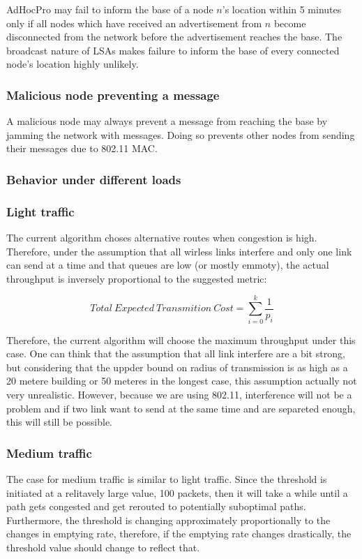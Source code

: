 \documentclass[letterpaper]{article}
\begin{document}
AdHocPro may fail to inform the base of a node $n$'s location within 5 minutes only if all nodes which have received an
advertisement from $n$ become disconnected from the network before the advertisement reaches the base. The broadcast
nature of LSAs makes failure to inform the base of every connected node's location highly unlikely.

\subsubsection{Malicious node preventing a message}

A malicious node may always prevent a message from reaching the base by jamming the network with messages. Doing so prevents
other nodes from sending their messages due to 802.11 MAC.

\subsubsection{Behavior under different loads}

\subsubsection{Light traffic}

The current algorithm choses alternative routes when congestion is high. Therefore, under the assumption that all wirless links interfere and only one link can send at a time and that queues are low (or mostly emmoty), the actual throughput is inversely proportional to the suggested metric:

$$  Total \ Expected \ Transmition \ Cost = \sum_{i=0}^{k}\frac{1}{p_{i}}$$

Therefore, the current algorithm will choose the maximum throughput under this case. One can think that the assumption that all link interfere are a bit strong, but considering that the uppder bound on radius of transmission is as high as a 20 metere building or 50 meteres in the longest case, this assumption actually not very unrealistic. However, because we are using 802.11, interference will not be a problem and if two link want to send at the same time and are separeted enough, this will still be possible.

\subsubsection{Medium traffic}

The case for medium traffic is similar to light traffic. Since the threshold is initiated at a relitavely large value, 100 packets, then it will take a while until a path gets congested and get rerouted to potentially suboptimal paths. Furthermore, the threshold is changing approximately proportionally to the changes in emptying rate, therefore, if the emptying rate changes drastically, the threshold value should change to reflect that.
\end{document}
